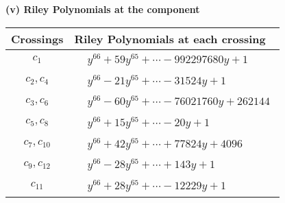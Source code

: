 \documentclass[1p]{elsarticle_modified}
\theoremstyle{definition}
\begin{document}
\flushleft \textbf{(v) Riley Polynomials at the component}\newline \\
\begin{tabular}{m{50pt}|m{274pt}}
Crossings & \hspace{64pt}Riley Polynomials at each crossing \\
\hline $$\begin{aligned}c_{1}\end{aligned}$$&$\begin{aligned}
&y^{66}+59 y^{65}+\cdots-992297680 y+1
\end{aligned}$\\
\hline $$\begin{aligned}c_{2},c_{4}\end{aligned}$$&$\begin{aligned}
&y^{66}-21 y^{65}+\cdots-31524 y+1
\end{aligned}$\\
\hline $$\begin{aligned}c_{3},c_{6}\end{aligned}$$&$\begin{aligned}
&y^{66}-60 y^{65}+\cdots-76021760 y+262144
\end{aligned}$\\
\hline $$\begin{aligned}c_{5},c_{8}\end{aligned}$$&$\begin{aligned}
&y^{66}+15 y^{65}+\cdots-20 y+1
\end{aligned}$\\
\hline $$\begin{aligned}c_{7},c_{10}\end{aligned}$$&$\begin{aligned}
&y^{66}+42 y^{65}+\cdots+77824 y+4096
\end{aligned}$\\
\hline $$\begin{aligned}c_{9},c_{12}\end{aligned}$$&$\begin{aligned}
&y^{66}-28 y^{65}+\cdots+143 y+1
\end{aligned}$\\
\hline $$\begin{aligned}c_{11}\end{aligned}$$&$\begin{aligned}
&y^{66}+28 y^{65}+\cdots-12229 y+1
\end{aligned}$\\
\hline
\end{tabular}\\~\\
\end{document}
